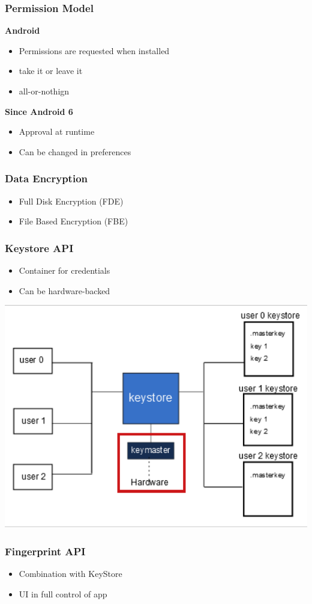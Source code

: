 \subsubsection{Permission Model}
\textbf{Android }
\begin{itemize}
    \item Permissions are requested when installed
    \item take it or leave it
    \item all-or-nothign
\end{itemize}
\textbf{Since Android 6}
\begin{itemize}
    \item Approval at runtime
    \item Can be changed in preferences
\end{itemize}

\subsubsection{Data Encryption}
\begin{itemize}
    \item Full Disk Encryption (FDE)
    \item File Based Encryption (FBE)
\end{itemize}

\subsubsection{Keystore API}
\begin{itemize}
    \item Container for credentials
    \item Can be hardware-backed
\end{itemize}
\includegraphics[width=0.6\linewidth]{../img/keystore_api.png}

\subsubsection{Fingerprint API}
\begin{itemize}
    \item Combination with KeyStore
    \item UI in full control of app
\end{itemize}

